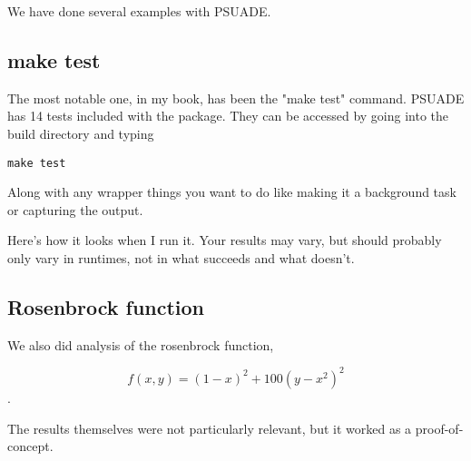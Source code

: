 We have done several examples with PSUADE.

\subsection{make test}

The most notable one, in my book, has been the "make test" command. PSUADE has 14 tests included with the package. They can be accessed by going into the build directory and typing

\begin{verbatim}
make test
\end{verbatim}

Along with any wrapper things you want to do like making it a background task or capturing the output.

Here's how it looks when I run it. Your results may vary, but should probably only vary in runtimes, not in what succeeds and what doesn't.



\subsection{Rosenbrock function}

We also did analysis of the rosenbrock function, 

$$f(x,y) = (1-x)^2 + 100(y-x^2)^2$$.

The results themselves were not particularly relevant, but it worked as a proof-of-concept.








